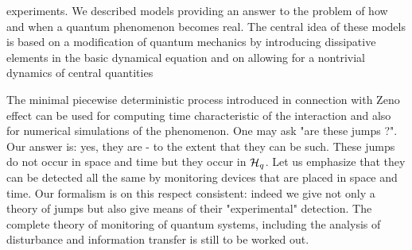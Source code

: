 experiments. We described models providing an answer to the problem
of how and when a quantum phenomenon becomes real. The central idea of
these models is based on a modification of quantum mechanics by
introducing dissipative elements in the basic dynamical equation and
on allowing for a nontrivial dynamics of central quantities
\par
The minimal piecewise deterministic process introduced in
connection with Zeno effect can be used for computing time
characteristic of the interaction and also for numerical
simulations of the phenomenon. One may ask "are these jumps
?". Our answer is: yes, they are  -
to the extent that they can be such. These jumps do not occur in space
and time but they occur in ${\cal H}_q$. Let us emphasize that they
can be detected all the same by monitoring devices that are placed in
space and time. Our formalism is on this respect consistent:
indeed we give not only a theory of jumps but also give means of their
"experimental" detection. The complete theory of monitoring of
quantum systems, including the analysis of disturbance and
information transfer is still to be worked out.

